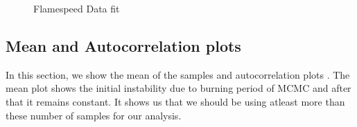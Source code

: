  \begin{figure}[H]
  \ContinuedFloat
  \centering
  \caption{Flamespeed Data fit}
\end{figure}



\subsection{Mean and Autocorrelation plots}

\noindent In this section, we show the mean of the samples and autocorrelation plots . The mean plot shows the initial instability due to burning period of MCMC and after that it remains constant. It shows us that we should be using atleast more than these number of samples for our analysis. 

